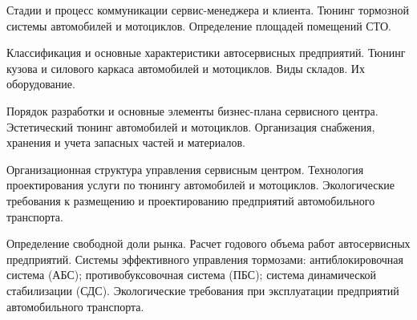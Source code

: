 \documentclass[
	11pt,
	a4paper,
	]
	{article}
\begin{document}
\bigskip

\noindent{} 
	{
		Стадии и процесс коммуникации сервис-менеджера и клиента.
	}{
		Тюнинг тормозной системы автомобилей и мотоциклов.
	}{
		Определение площадей помещений СТО.
	}

\bigskip

\noindent{} 
	{
		Классификация и основные характеристики автосервисных предприятий.
	}{
		Тюнинг кузова и силового каркаса автомобилей и мотоциклов.
	}{
		Виды складов. Их оборудование.
	}

\bigskip

\noindent{} 
	{
		Порядок разработки и основные элементы бизнес-плана сервисного центра.
	}{
		Эстетический тюнинг автомобилей и мотоциклов.
	}{
		Организация снабжения, хранения и учета запасных частей и материалов.
	}

\bigskip

\noindent{} 
	{
		Организационная структура управления сервисным центром.
	}{
		Технология проектирования услуги по тюнингу автомобилей и мотоциклов.
	}{
		Экологические требования к размещению и проектированию предприятий автомобильного транспорта.
	}

\bigskip

\noindent{} 
	{
		Определение свободной доли рынка. Расчет годового объема работ автосервисных предприятий.
	}{
		Системы эффективного управления тормозами: антиблокировочная система (АБС); противобуксовочная система (ПБС); система динамической стабилизации (СДС).
	}{
		Экологические требования при эксплуатации предприятий автомобильного транспорта.
	}

\bigskip
\end{document}
